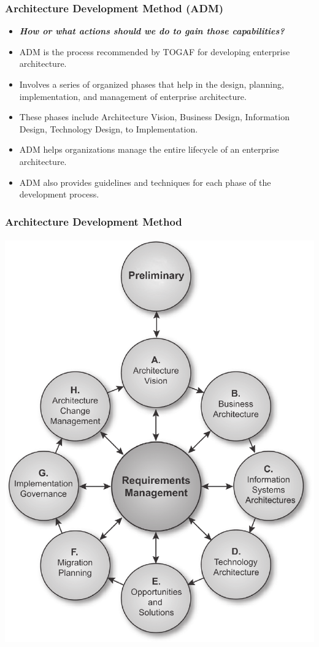 \documentclass[aspectratio=169, table]{beamer}
\begin{document}
	
	\begin{frame}
		\frametitle{Architecture Development Method (ADM)}
		\begin{itemize}
			\item \textbf{\textit{How or what actions should we do to gain those capabilities?}}
			\item ADM is the process recommended by TOGAF for developing enterprise architecture.
			\item Involves a series of organized phases that help in the design, planning, implementation, and management of enterprise architecture.
			\item These phases include Architecture Vision, Business Design, Information Design, Technology Design, to Implementation.
			\item ADM helps organizations manage the entire lifecycle of an enterprise architecture.
			\item ADM also provides guidelines and techniques for each phase of the development process.
		\end{itemize}
	\end{frame}
	
	{
		\begin{frame}
			\frametitle{Architecture Development Method}
			\framesubtitle{\hspace{1cm}}
			\begin{center}
				\includegraphics[width=.43\textwidth]{../figures/architecture_development_method}
			\end{center}
		\end{frame}
	}
	
\end{document}
